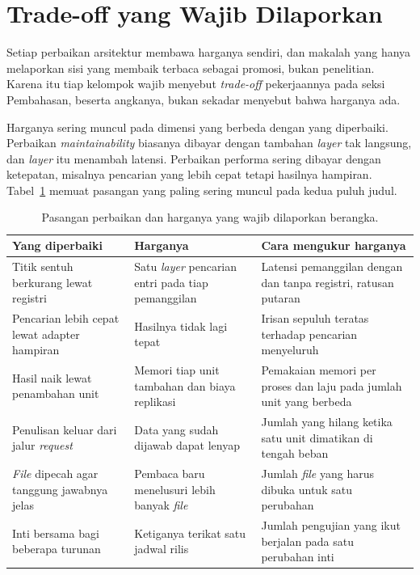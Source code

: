 \section{Trade-off yang Wajib Dilaporkan}

Setiap perbaikan arsitektur membawa harganya sendiri, dan makalah yang hanya
melaporkan sisi yang membaik terbaca sebagai promosi, bukan penelitian. Karena
itu tiap kelompok wajib menyebut \textit{trade-off} pekerjaannya pada seksi
Pembahasan, beserta angkanya, bukan sekadar menyebut bahwa harganya ada.

Harganya sering muncul pada dimensi yang berbeda dengan yang diperbaiki.
Perbaikan \textit{maintainability} biasanya dibayar dengan tambahan \textit{layer}
tak langsung, dan \textit{layer} itu menambah latensi. Perbaikan performa sering
dibayar dengan ketepatan, misalnya pencarian yang lebih cepat tetapi
hasilnya hampiran. Tabel~\ref{tab:tradeoff} memuat pasangan yang paling sering
muncul pada kedua puluh judul.

\begin{table}[htbp]
  \centering
  \caption{Pasangan perbaikan dan harganya yang wajib dilaporkan berangka.}
  \label{tab:tradeoff}
  \begin{tabularx}{\textwidth}{|X|X|X|}
    \hline
    \textbf{Yang diperbaiki} & \textbf{Harganya} & \textbf{Cara mengukur harganya} \\
    \hline
    Titik sentuh berkurang lewat registri & Satu \textit{layer} pencarian entri pada tiap pemanggilan & Latensi pemanggilan dengan dan tanpa registri, ratusan putaran \\
    \hline
    Pencarian lebih cepat lewat adapter hampiran & Hasilnya tidak lagi tepat & Irisan sepuluh teratas terhadap pencarian menyeluruh \\
    \hline
    Hasil naik lewat penambahan unit & Memori tiap unit tambahan dan biaya replikasi & Pemakaian memori per proses dan laju pada jumlah unit yang berbeda \\
    \hline
    Penulisan keluar dari jalur \textit{request} & Data yang sudah dijawab dapat lenyap & Jumlah yang hilang ketika satu unit dimatikan di tengah beban \\
    \hline
    \textit{File} dipecah agar tanggung jawabnya jelas & Pembaca baru menelusuri lebih banyak \textit{file} & Jumlah \textit{file} yang harus dibuka untuk satu perubahan \\
    \hline
    Inti bersama bagi beberapa turunan & Ketiganya terikat satu jadwal rilis & Jumlah pengujian yang ikut berjalan pada satu perubahan inti \\
    \hline
  \end{tabularx}
\end{table}

